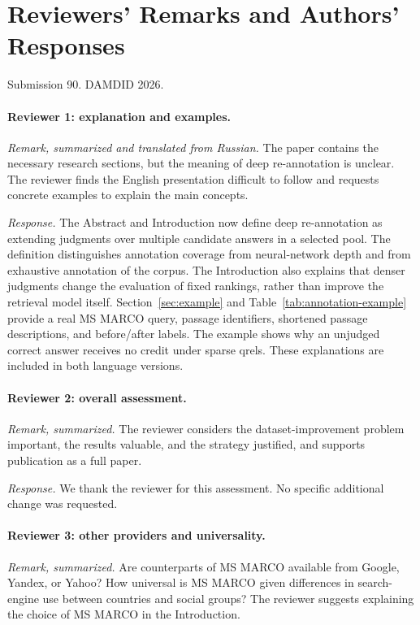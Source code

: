\section*{Reviewers' Remarks and Authors' Responses}
\noindent Submission 90. DAMDID 2026.

\paragraph{Reviewer 1: explanation and examples.}
\emph{Remark, summarized and translated from Russian.} The paper contains the necessary research sections, but the meaning of deep re-annotation is unclear. The reviewer finds the English presentation difficult to follow and requests concrete examples to explain the main concepts.

\emph{Response.} The Abstract and Introduction now define deep re-annotation as extending judgments over multiple candidate answers in a selected pool. The definition distinguishes annotation coverage from neural-network depth and from exhaustive annotation of the corpus. The Introduction also explains that denser judgments change the evaluation of fixed rankings, rather than improve the retrieval model itself. Section~\ref{sec:example} and Table~\ref{tab:annotation-example} provide a real MS MARCO query, passage identifiers, shortened passage descriptions, and before/after labels. The example shows why an unjudged correct answer receives no credit under sparse qrels. These explanations are included in both language versions.

\paragraph{Reviewer 2: overall assessment.}
\emph{Remark, summarized.} The reviewer considers the dataset-improvement problem important, the results valuable, and the strategy justified, and supports publication as a full paper.

\emph{Response.} We thank the reviewer for this assessment. No specific additional change was requested.

\paragraph{Reviewer 3: other providers and universality.}
\emph{Remark, summarized.} Are counterparts of MS MARCO available from Google, Yandex, or Yahoo? How universal is MS MARCO given differences in search-engine use between countries and social groups? The reviewer suggests explaining the choice of MS MARCO in the Introduction.

